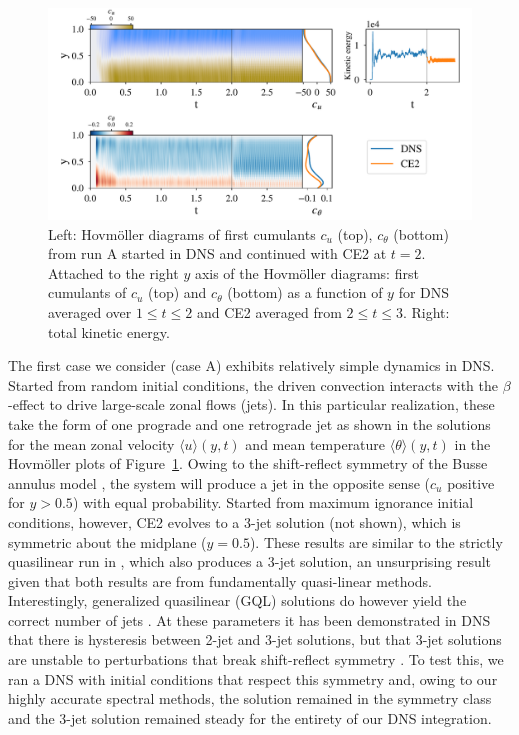 \documentclass{jfm}
\newcommand{\ct}{c_{\theta}}
\newcommand{\cu}{c_u}
\begin{document}
\begin{figure}
  \centering
  \includegraphics[width=\textwidth]{run_A_fig.pdf}
  \caption{Left: Hovm\"oller diagrams of first cumulants $\cu$ (top), $c_\theta$ (bottom) from run A started in DNS and continued with CE2 at $t=2$. Attached to the right $y$ axis of the Hovm\"oller diagrams: first cumulants of $\cu$ (top) and $\ct$ (bottom) as a function of $y$ for DNS averaged over $1 \le t \le 2$ and CE2 averaged from $2 \le t \le 3$. Right: total kinetic energy.}
  \label{fig:run_A}
\end{figure}

The first case we consider (case A) exhibits relatively simple dynamics in DNS. Started from random initial conditions, the driven convection interacts with the $\beta$-effect to drive large-scale zonal flows (jets). In this particular realization, these take the form of one prograde and one retrograde jet as shown in the solutions for the mean zonal velocity $\langle u \rangle(y, t)$ and mean temperature $\langle \theta\rangle(y,t) $ in the Hovm\"oller plots of Figure~\ref{fig:run_A}. 
Owing to the shift-reflect symmetry of the Busse annulus model \citep[e.g.]{bh1993}, the system will produce a jet in the opposite sense ($\cu$ positive for $y > 0.5$) with equal probability. 
Started from maximum ignorance initial conditions, however, CE2 evolves to a 3-jet solution (not shown), which is symmetric about the midplane ($y=0.5$). These results are similar to the strictly quasilinear run in \citet{tom_2018}, which also produces a 3-jet solution, an unsurprising result given that both results are from fundamentally quasi-linear methods. Interestingly, generalized quasilinear (GQL) solutions do however yield the correct number of jets \citep{tom_2018}. At these parameters it has been demonstrated in DNS that there is hysteresis between 2-jet and 3-jet solutions, but that 3-jet solutions are unstable to perturbations that break shift-reflect symmetry \citep{bh1993}. To test this, we ran a DNS with initial conditions that respect this symmetry and, owing to our highly accurate spectral methods, the solution remained in the symmetry class and the 3-jet solution remained steady for the entirety of our DNS integration.
\end{document}
